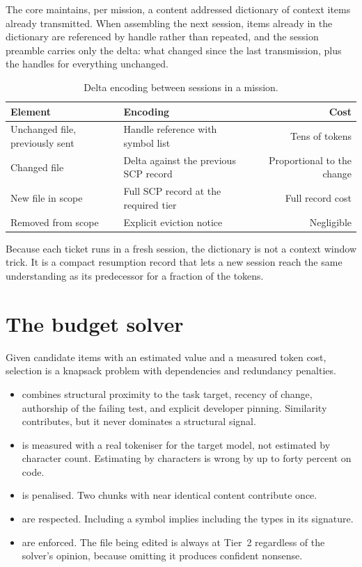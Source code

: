 The core maintains, per mission, a content addressed dictionary of context items already
transmitted. When assembling the next session, items already in the dictionary are referenced
by handle rather than repeated, and the session preamble carries only the delta: what changed
since the last transmission, plus the handles for everything unchanged.

\begin{table}[h]
\centering
\small
\begin{tabularx}{\textwidth}{l X r}
\toprule
\textbf{Element} & \textbf{Encoding} & \textbf{Cost} \\
\midrule
Unchanged file, previously sent & Handle reference with symbol list & Tens of tokens \\
Changed file & Delta against the previous SCP record & Proportional to the change \\
New file in scope & Full SCP record at the required tier & Full record cost \\
Removed from scope & Explicit eviction notice & Negligible \\
\bottomrule
\end{tabularx}
\caption{Delta encoding between sessions in a mission.}
\end{table}

Because each ticket runs in a fresh session, the dictionary is not a context window trick. It
is a compact resumption record that lets a new session reach the same understanding as its
predecessor for a fraction of the tokens.

\section{The budget solver}

Given candidate items with an estimated value and a measured token cost, selection is a
knapsack problem with dependencies and redundancy penalties.

\begin{itemize}
  \item {} combines structural proximity to the task target, recency of change,
  authorship of the failing test, and explicit developer pinning. Similarity contributes, but
  it never dominates a structural signal.
  \item {} is measured with a real tokeniser for the target model, not estimated by
  character count. Estimating by characters is wrong by up to forty percent on code.
  \item {} is penalised. Two chunks with near identical content contribute once.
  \item {} are respected. Including a symbol implies including the types in
  its signature.
  \item {} are enforced. The file being edited is always at Tier~2 regardless of the
  solver's opinion, because omitting it produces confident nonsense.
\end{itemize}

